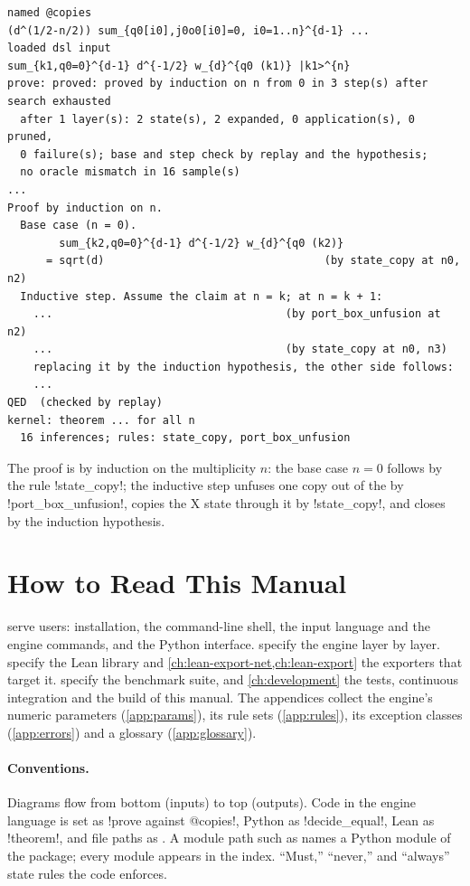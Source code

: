 \begin{lstlisting}[style=grammar]
named @copies
(d^(1/2-n/2)) sum_{q0[i0],j0o0[i0]=0, i0=1..n}^{d-1} ...
loaded dsl input
sum_{k1,q0=0}^{d-1} d^{-1/2} w_{d}^{q0 (k1)} |k1>^{n}
prove: proved: proved by induction on n from 0 in 3 step(s) after search exhausted
  after 1 layer(s): 2 state(s), 2 expanded, 0 application(s), 0 pruned,
  0 failure(s); base and step check by replay and the hypothesis;
  no oracle mismatch in 16 sample(s)
...
Proof by induction on n.
  Base case (n = 0).
        sum_{k2,q0=0}^{d-1} d^{-1/2} w_{d}^{q0 (k2)}
      = sqrt(d)                                  (by state_copy at n0, n2)
  Inductive step. Assume the claim at n = k; at n = k + 1:
    ...                                    (by port_box_unfusion at n2)
    ...                                    (by state_copy at n0, n3)
    replacing it by the induction hypothesis, the other side follows:
    ...
QED  (checked by replay)
kernel: theorem ... for all n
  16 inferences; rules: state_copy, port_box_unfusion
\end{lstlisting}

The proof is by induction on the multiplicity $n$: the base case $n=0$ follows by the rule \azx!state_copy!; the inductive step unfuses one copy out of the \bbox{} by \azx!port_box_unfusion!, copies the X state through it by \azx!state_copy!, and closes by the induction hypothesis.

\section{How to Read This Manual}\label{sec:overview-reading}

 serve users: installation, the command-line shell, the input language and the engine commands, and the Python interface.  specify the engine layer by layer.  specify the Lean library and \cref{ch:lean-export-net,ch:lean-export} the exporters that target it.  specify the benchmark suite, and \cref{ch:development} the tests, continuous integration and the build of this manual. The appendices collect the engine's numeric parameters (\cref{app:params}), its rule sets (\cref{app:rules}), its exception classes (\cref{app:errors}) and a glossary (\cref{app:glossary}).

\paragraph{Conventions.} Diagrams flow from bottom (inputs) to top (outputs). Code in the engine language is set as \azx!prove against @copies!, Python as \py!decide_equal!, Lean as \lean!theorem!, and file paths as . A module path such as  names a Python module of the package; every module appears in the index. ``Must,'' ``never,'' and ``always'' state rules the code enforces.

